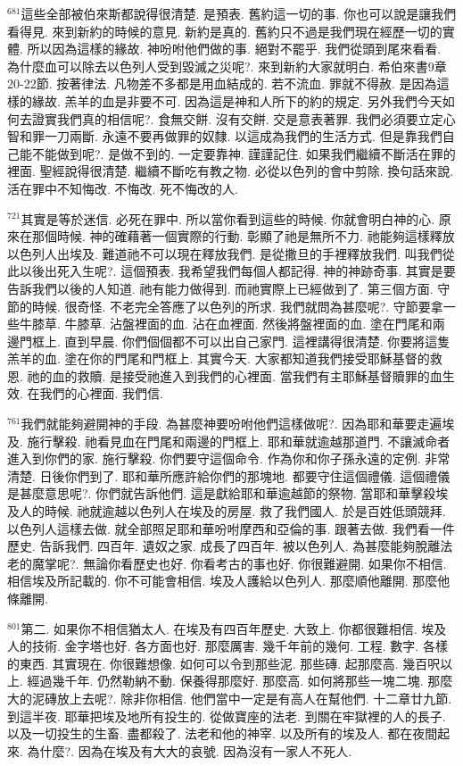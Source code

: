 \documentclass{book}
\begin{document}
$^{681}$這些全部被伯來斯都說得很清楚.
是預表.
舊約這一切的事.
你也可以說是讓我們看得見.
來到新約的時候的意見.
新約是真的.
舊約只不過是我們現在經歷一切的實體.
所以因為這樣的緣故.
神吩咐他們做的事.
絕對不罷乎.
我們從頭到尾來看看.
為什麼血可以除去以色列人受到毀滅之災呢?.
來到新約大家就明白.
希伯來書9章20-22節.
按著律法.
凡物差不多都是用血結成的.
若不流血.
罪就不得赦.
是因為這樣的緣故.
羔羊的血是非要不可.
因為這是神和人所下的約的規定.
另外我們今天如何去證實我們真的相信呢?.
食無交餅.
沒有交餅.
交是意表著罪.
我們必須要立定心智和罪一刀兩斷.
永遠不要再做罪的奴隸.
以這成為我們的生活方式.
但是靠我們自己能不能做到呢?.
是做不到的.
一定要靠神.
謹謹記住.
如果我們繼續不斷活在罪的裡面.
聖經說得很清楚.
繼續不斷吃有教之物.
必從以色列的會中剪除.
換句話來說.
活在罪中不知悔改.
不悔改.
死不悔改的人.

$^{721}$其實是等於迷信.
必死在罪中.
所以當你看到這些的時候.
你就會明白神的心.
原來在那個時候.
神的確藉著一個實際的行動.
彰顯了祂是無所不力.
祂能夠這樣釋放以色列人出埃及.
難道祂不可以現在釋放我們.
是從撒旦的手裡釋放我們.
叫我們從此以後出死入生呢?.
這個預表.
我希望我們每個人都記得.
神的神跡奇事.
其實是要告訴我們以後的人知道.
祂有能力做得到.
而祂實際上已經做到了.
第三個方面.
守節的時候.
很奇怪.
不老完全答應了以色列的所求.
我們就問為甚麼呢?.
守節要拿一些牛膝草.
牛膝草.
沾盤裡面的血.
沾在血裡面.
然後將盤裡面的血.
塗在門尾和兩邊門框上.
直到早晨.
你們個個都不可以出自己家門.
這裡講得很清楚.
你要將這隻羔羊的血.
塗在你的門尾和門框上.
其實今天.
大家都知道我們接受耶穌基督的救恩.
祂的血的救贖.
是接受祂進入到我們的心裡面.
當我們有主耶穌基督贖罪的血生效.
在我們的心裡面.
我們信.

$^{761}$我們就能夠避開神的手段.
為甚麼神要吩咐他們這樣做呢?.
因為耶和華要走遍埃及.
施行擊殺.
祂看見血在門尾和兩邊的門框上.
耶和華就逾越那道門.
不讓滅命者進入到你們的家.
施行擊殺.
你們要守這個命令.
作為你和你子孫永遠的定例.
非常清楚.
日後你們到了.
耶和華所應許給你們的那塊地.
都要守住這個禮儀.
這個禮儀是甚麼意思呢?.
你們就告訴他們.
這是獻給耶和華逾越節的祭物.
當耶和華擊殺埃及人的時候.
祂就逾越以色列人在埃及的房屋.
救了我們國人.
於是百姓低頭競拜.
以色列人這樣去做.
就全部照足耶和華吩咐摩西和亞倫的事.
跟著去做.
我們看一件歷史.
告訴我們.
四百年.
遺奴之家.
成長了四百年.
被以色列人.
為甚麼能夠脫離法老的魔掌呢?.
無論你看歷史也好.
你看考古的事也好.
你很難避開.
如果你不相信.
相信埃及所記載的.
你不可能會相信.
埃及人護給以色列人.
那麼順他離開.
那麼他條離開.

$^{801}$第二.
如果你不相信猶太人.
在埃及有四百年歷史.
大致上.
你都很難相信.
埃及人的技術.
金字塔也好.
各方面也好.
那麼厲害.
幾千年前的幾何.
工程.
數字.
各樣的東西.
其實現在.
你很難想像.
如何可以令到那些泥.
那些磚.
起那麼高.
幾百呎以上.
經過幾千年.
仍然勒納不動.
保養得那麼好.
那麼高.
如何將那些一塊二塊.
那麼大的泥磚放上去呢?.
除非你相信.
他們當中一定是有高人在幫他們.
十二章廿九節.
到這半夜.
耶華把埃及地所有投生的.
從做寶座的法老.
到關在牢獄裡的人的長子.
以及一切投生的生畜.
盡都殺了.
法老和他的神宰.
以及所有的埃及人.
都在夜間起來.
為什麼?.
因為在埃及有大大的哀號.
因為沒有一家人不死人.
\end{document}
